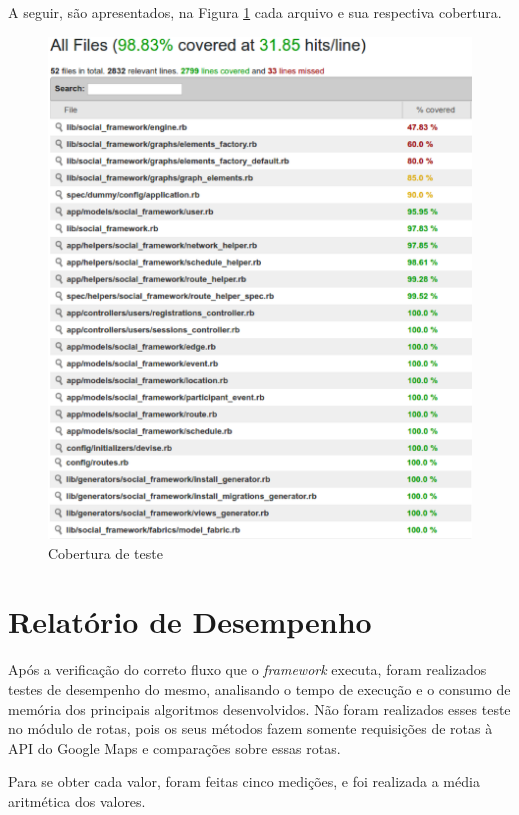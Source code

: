A seguir, são apresentados, na Figura \ref{Cobertura_teste} cada arquivo e sua respectiva cobertura.

\begin{figure}[!h]
	\centering
	\includegraphics[scale=0.60]{figuras/resultados/cobertura.eps}
	\caption[Cobertura de teste]{Cobertura de teste}
	\label{Cobertura_teste}
\end{figure}

\section{Relatório de Desempenho}

Após a verificação do correto fluxo que o \textit{framework} executa, foram realizados testes de desempenho do mesmo, analisando o tempo de execução e o consumo de memória dos principais algoritmos desenvolvidos. Não foram realizados esses teste no módulo de rotas, pois os seus métodos fazem somente requisições de rotas à API do Google Maps e comparações sobre essas rotas.

Para se obter cada valor, foram feitas cinco medições, e foi realizada a média aritmética dos valores.


